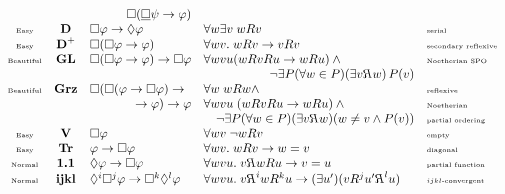 \documentclass[xcolor=x11names]{beamer}
\newcommand{\bemph}[1] {{\color{DeepSkyBlue3}{#1}}}
\newcommand{\lthen}{\rightarrow}
\newcommand{\forallin}[2]{(\forall #1 \in #2)}
\newcommand{\existsp}[1]{(\exists #1)}
\begin{document}
\begin{frame}
\[\begin{array}{cclll}
\\ && \hfill \Box (\underline{\Box} \psi \lthen \varphi)
\\ \textup{\tiny Easy}& \textbf {D} & \Box \varphi \lthen \Diamond \varphi &\forall {w}\exists{v}\; wRv&\textup{\tiny serial}
\\ \textup{\tiny Easy}& \textbf {D}^+ & \Box (\Box \varphi \lthen \varphi) &\forall {wv}.\; wRv\lthen vRv &\textup{\tiny secondary reflexive}
\\ \textup{\tiny Beautiful}& \textbf {GL} & \Box (\Box \varphi \lthen \varphi) \lthen \Box \varphi
& \forall {wvu} (wRvRu\lthen wRu) \land{}&\textup{\tiny Noetherian SPO}
\\& &&\hfill \lnot \exists P \forallin wP \existsp {v\reflectbox {$R$} w} \, P(v)&%
\\ \textup{\tiny Beautiful}& \textbf {Grz} & \Box (\Box (\varphi \lthen \Box \varphi) \lthen  & \forall {w}\; wRw\land&\textup{\tiny reflexive}
\\& &\hfill \lthen \varphi) \lthen \varphi& \forall {wvu}\; (wRvRu\lthen wRu ) \land{} &\textup{\tiny Noetherian}
\\& &&\quad \lnot \exists P \forallin w P\existsp {v\reflectbox {$R$}w} (w\neq v \land P(v))&\textup{\tiny partial ordering}
\\ \textup{\tiny Easy}& \textbf {V} & \Box \varphi &\forall {wv} \; \lnot wRv&\textup{\tiny empty}
\\ \textup{\tiny Easy}& \textbf {Tr} & \varphi \lthen \Box \varphi &\forall {wv}. \;wRv\lthen w=v &\textup{\tiny diagonal}
\\ \textup{\tiny Normal}& \textbf {1.1} & \Diamond \varphi \lthen \Box \varphi &\forall {wvu}. \; v\reflectbox {$R$}wRu \lthen v=u&\textup{\tiny partial function}
\\ \textup{\tiny Normal}& \textbf {ijkl} & \Diamond ^i\Box ^j\varphi \lthen \Box^k \Diamond^l\varphi &\forall {wvu}.\;v\reflectbox {$R$}^iwR^ku\lthen  \existsp{u'} (vR^ju'\reflectbox {$R$}^lu)&\textup{\tiny $ijkl$-convergent}
\end{array}\]


\end{frame}
\end{document}
